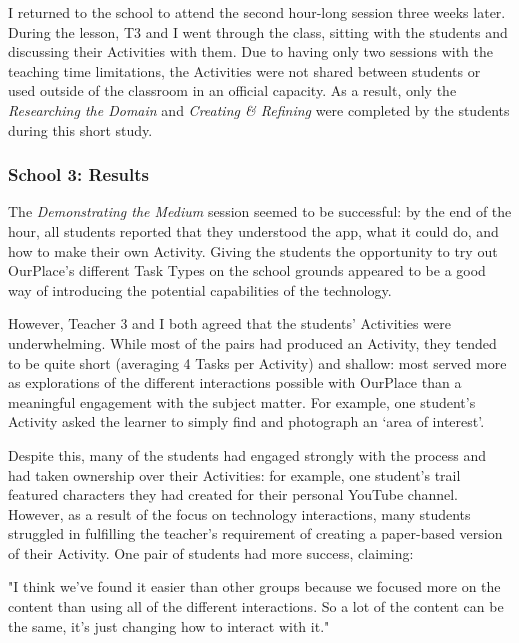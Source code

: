 I returned to the school to attend the second hour-long session three weeks later. During the lesson, T3 and I went through the class, sitting with the students and discussing their Activities with them. Due to having only two sessions with the teaching time limitations, the Activities were not shared between students or used outside of the classroom in an official capacity. As a result, only the \textit{Researching the Domain} and \textit{Creating \& Refining} were completed by the students during this short study.

\subsubsection{School 3: Results}

The \textit{Demonstrating the Medium} session seemed to be successful: by the end of the hour, all students reported that they understood the app, what it could do, and how to make their own Activity. Giving the students the opportunity to try out OurPlace's different Task Types on the school grounds appeared to be a good way of introducing the potential capabilities of the technology.

However, Teacher 3 and I both agreed that the students' Activities were underwhelming. While most of the pairs had produced an Activity, they tended to be quite short (averaging 4 Tasks per Activity) and shallow: most served more as explorations of the different interactions possible with OurPlace than a meaningful engagement with the subject matter. For example, one student's Activity asked the learner to simply find and photograph an `area of interest'.

Despite this, many of the students had engaged strongly with the process and had taken ownership over their Activities: for example, one student's trail featured characters they had created for their personal YouTube channel. However, as a result of the focus on technology interactions, many students struggled in fulfilling the teacher's requirement of creating a paper-based version of their Activity. One pair of students had more success, claiming:

\begin{displayquote}
"I think we've found it easier than other groups because we focused more on the content than using all of the different interactions. So a lot of the content can be the same, it's just changing how to interact with it."
\end{displayquote}

